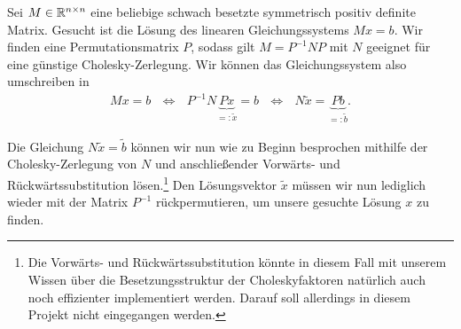 \documentclass{article}
\begin{document}
Sei $M \in \mathbb{R}^{n \times n}$ eine beliebige schwach besetzte symmetrisch positiv definite Matrix. Gesucht ist die Lösung des linearen Gleichungssystems $Mx=b$. Wir finden eine Permutationsmatrix $P$, sodass gilt $M = P^{-1}NP$ mit $N$ geeignet für eine günstige Cholesky-Zerlegung. Wir können das Gleichungssystem also umschreiben in
\begin{align*}
    Mx = b \text{~~} \Leftrightarrow \text{~~} P^{-1}N\underbrace{Px}_{=\colon\widetilde{x}} = b \text{~~} \Leftrightarrow \text{~~} N\widetilde{x} = \underbrace{Pb}_{=\colon\widetilde{b}}.
\end{align*}

Die Gleichung $ N\widetilde{x} = \widetilde{b}$ können wir nun wie zu Beginn besprochen mithilfe der Cholesky-Zerlegung von $N$ und anschließender Vorwärts- und Rückwärtssubstitution lösen.\footnote{Die Vorwärts- und Rückwärtssubstitution könnte in diesem Fall mit unserem Wissen über die Besetzungsstruktur der Choleskyfaktoren natürlich auch noch effizienter implementiert werden. Darauf soll allerdings in diesem Projekt nicht eingegangen werden.} Den Lösungsvektor $\widetilde{x}$ müssen wir nun lediglich wieder mit der Matrix $P^{-1}$ rückpermutieren, um unsere gesuchte Lösung $x$ zu finden.
\end{document}
